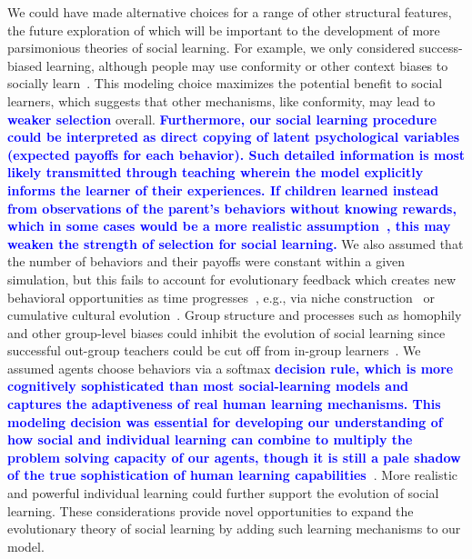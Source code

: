 \documentclass[letterpaper,11.5pt]{scrartcl}
\newcommand{\edit}[1]{{\bfseries \textcolor{blue} {#1}}}
\begin{document}
We could have made alternative choices for a range of other structural features, the future exploration of which
will be important to the development of more parsimonious theories of social learning.  
For example, we only considered success-biased learning, although people may use conformity or other context biases to socially learn~\citep{BoydRicherson1985,Muthukrishna2016a,Smaldino2018b}. This modeling
choice maximizes the potential benefit to social learners, which suggests that
other mechanisms, like conformity, may lead to \edit{weaker selection} overall. 
\edit{Furthermore, our social learning procedure could be interpreted as direct copying of latent psychological variables (expected payoffs for each behavior). Such detailed information is most likely transmitted through teaching wherein the model explicitly informs the learner of their experiences. If children learned instead from observations of the parent's behaviors without knowing rewards, which in some cases would be a more realistic assumption~\citep{Wu2022b}, this may weaken the strength of selection for social learning.} We also assumed that the number of behaviors and their payoffs were constant within a
given simulation, but this fails to account for evolutionary feedback which creates
new behavioral opportunities as time progresses\edit{~\citep{Chimento2022}}, e.g., via niche
construction~\citep{Smaldino2012a,Heras-Escribano2020} or cumulative cultural
evolution~\citep{Smolla2019,Derex2020}.  Group structure and processes such as
homophily and other group-level biases could inhibit the evolution of social
learning since successful out-group teachers could be cut off from in-group
learners~\citep{Golub2012}. We assumed agents choose behaviors via a softmax \edit{decision rule, which is more cognitively sophisticated than most social-learning models and captures the adaptiveness of real human learning mechanisms. This modeling decision was essential for developing our understanding of how social and individual learning can combine to multiply the problem solving capacity of our agents, though it is still a pale shadow of the true sophistication of human learning capabilities~\citep{Schulz2020a,Wu2022}}. More realistic and powerful individual learning could further support the evolution of
social learning. These considerations provide novel opportunities to expand the evolutionary theory of social learning by adding
such learning mechanisms to our model.

\end{document}
